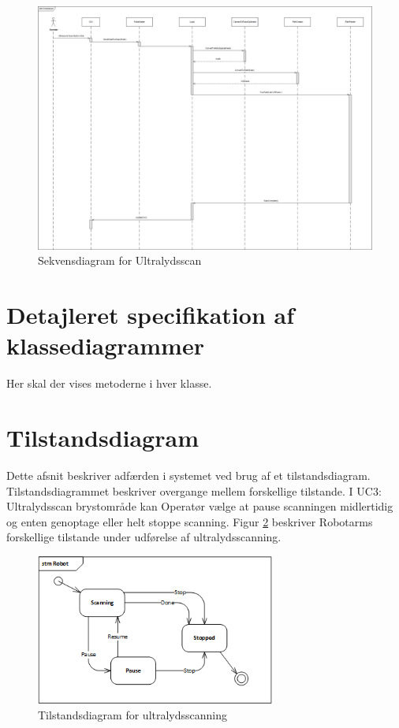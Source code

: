 \begin{figure}[H]
    \centering
    \includegraphics[width=1.2\textwidth, angle =90]{figurer/d/Design/Sequence/sd_ultrascan}
    \caption{Sekvensdiagram for Ultralydsscan}
    \label{sd_ultrascan}
\end{figure}

\section{Detajleret specifikation af klassediagrammer}
Her skal der vises metoderne i hver klasse. 

\section{Tilstandsdiagram}
Dette afsnit beskriver adfærden i systemet ved brug af et tilstandsdiagram. Tilstandsdiagrammet beskriver overgange mellem forskellige tilstande. I UC3: Ultralydsscan brystområde kan Operatør vælge at pause scanningen midlertidig og enten genoptage eller helt stoppe scanning. Figur \ref{stm_Ultra} beskriver Robotarms forskellige tilstande under udførelse af ultralydsscanning. 

\begin{figure}[H]
    \centering
    \includegraphics[width=0.7\textwidth]{figurer/d/Design/stm_UC3}
    \caption{Tilstandsdiagram for ultralydsscanning}
    \label{stm_Ultra}
\end{figure}

